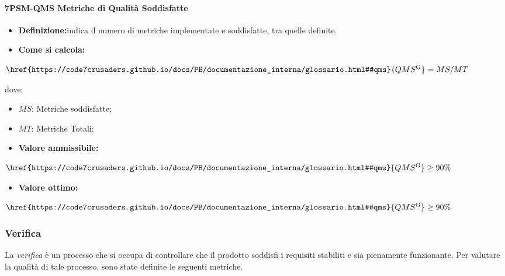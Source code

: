 \paragraph*{7PSM-QMS Metriche di Qualità Soddisfatte}
\begin{itemize}
    \item \textbf{Definizione:}indica il numero di metriche implementate e soddisfatte, tra quelle definite.
    \item \textbf{Come si calcola:}
\end{itemize}
\begin{center}
    $\href{https://code7crusaders.github.io/docs/PB/documentazione_interna/glossario.html#qms}{QMS\textsuperscript{G}} = MS/MT$ 
 \end{center}
 dove:
 \begin{itemize}[label=$\rightarrow$]
     \item $MS$: Metriche soddisfatte;
     \item $MT$: Metriche Totali;
 \end{itemize}
\begin{itemize}
    \item \textbf{Valore ammissibile:}
\end{itemize}
\begin{center}
    $\href{https://code7crusaders.github.io/docs/PB/documentazione_interna/glossario.html#qms}{QMS\textsuperscript{G}} \geq 90\%$
\end{center}
\begin{itemize}
    \item \textbf{Valore ottimo:}
\end{itemize}
\begin{center}
    $\href{https://code7crusaders.github.io/docs/PB/documentazione_interna/glossario.html#qms}{QMS\textsuperscript{G}} \geq 90\%$
\end{center}

\subsubsection{Verifica}
La \emph{verifica} è un processo che si occupa di controllare che il prodotto soddisfi i requisiti
stabiliti e sia pienamente funzionante. Per valutare la qualità di tale processo, sono state
definite le seguenti metriche.

